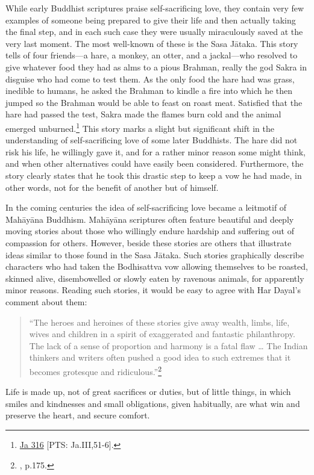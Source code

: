 \documentclass[10pt, openright]{book}
\newenvironment{epigram-2}%
{%
\vspace{1em}
\noindent
\quoting[leftmargin=2.5cm,rightmargin=2.5cm]%
\begin{itshape}
\large
}%
{\end{itshape}\endquoting
}%
\begin{document}
While early Buddhist scriptures praise self-sacrificing love, they contain very few examples of someone being prepared to give their life and then actually taking the final step, and in each such case they were usually miraculously saved at the very last moment. The most well-known of these is the Sasa Jātaka. This story tells of four friends—a hare, a monkey, an otter, and a jackal—who resolved to give whatever food they had as alms to a pious Brahman, really the god Sakra in disguise who had come to test them. As the only food the hare had was grass, inedible to humans, he asked the Brahman to kindle a fire into which he then jumped so the Brahman would be able to feast on roast meat. Satisfied that the hare had passed the test, Sakra made the flames burn cold and the animal emerged unburned.\footnote {\href{https://suttacentral.net/ja316/en/francis-neil}{Ja 316} [PTS: Ja.III,51-6].} This story marks a slight but significant shift in the understanding of self-sacrificing love of some later Buddhists. The hare did not risk his life, he willingly gave it, and for a rather minor reason some might think, and when other alternatives could have easily been considered. Furthermore, the story clearly states that he took this drastic step to keep a vow he had made, in other words, not for the benefit of another but of himself.


In the coming centuries the idea of self-sacrificing love became a leitmotif of Mahāyāna Buddhism. Mahāyāna scriptures often feature beautiful and deeply moving stories about those who willingly endure hardship and suffering out of compassion for others. However, beside these stories are others that illustrate ideas similar to those found in the Sasa Jātaka. Such stories graphically describe characters who had taken the Bodhisattva vow allowing themselves to be roasted, skinned alive, disembowelled or slowly eaten by ravenous animals, for apparently minor reasons. Reading such stories, it would be easy to agree with Har Dayal’s comment about them:


\begin{quote}


“The heroes and heroines of these stories give away wealth, limbs, life, wives and children in a spirit of exaggerated and fantastic philanthropy. The lack of a sense of proportion and harmony is a fatal flaw … The Indian thinkers and writers often pushed a good idea to such extremes that it becomes grotesque and ridiculous.”\footnote {\cite{Dayal 1970}, p.175.}




\end{quote}
\begin{epigram-2}
Life is made up, not of great sacrifices or duties, but of little things, in which smiles and kindnesses and small obligations, given habitually, are what win and preserve the heart, and secure comfort.
\end{epigram-2}
\end{document}
